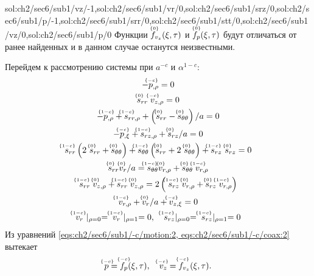 \expandafter\gdef\csname sol:ch2/sec6/sub1/main/int\endcsname{sol:ch2/sec6/sub1/vz/-1,sol:ch2/sec6/sub1/vr/0,sol:ch2/sec6/sub1/srz/0,sol:ch2/sec6/sub1/p/-1,sol:ch2/sec6/sub1/srr/0,sol:ch2/sec6/sub1/stt/0,sol:ch2/sec6/sub1/vz/0,sol:ch2/sec6/sub1/p/0}
Функции $\uindex{f}{0}_{v_{z}}(\xi,\tau)$ и $\uindex{f}{0}_{p}(\xi,\tau)$ будут отличаться от ранее найденных и в данном случае останутся неизвестными.

Перейдем к рассмотрению системы при $a^{-c}$ и $\alpha^{1-c}$:
\begin{gather}
  \label{eqs:ch2/sec6/sub1/-c/motion:2}
  -\uindex{p}{-c}_{,\rho} = 0
  \\
  \label{eqs:ch2/sec6/sub1/-c/coax:2}
  \uindex{s}{0}_{rr} \; \uindex{v}{-c}_{z,\rho} = 0
  \\
  \label{eqs:ch2/sec6/sub1/1-c/motion:1}
  -\uindex{p}{1-c}_{,\rho}+\uindex{s}{1-c}_{rr,\rho} +\left(\uindex{s}{0}_{rr}-\uindex{s}{0}_{\theta\theta}\right) / a = 0
  \\
  \label{eqs:ch2/sec6/sub1/1-c/motion:2}
  -\uindex{p}{-c}_{,\xi} + \uindex{s}{1-c}_{rz,\rho} + \uindex{s}{0}_{rz} / a = 0
  \\
  \label{eqs:ch2/sec6/sub1/1-c/plasticity}
  \uindex{s}{1-c}_{rr} \left(2 \ \uindex{s}{0}_{rr} + \uindex{s}{0}_{\theta\theta}\right) +
  \uindex{s}{1-c}_{\theta\theta} \left(\uindex{s}{0}_{rr} + 2 \ \uindex{s}{0}_{\theta\theta}\right) +
  \uindex{s}{1-c}_{rz} \ \uindex{s}{0}_{rz} = 0
  \\
  \label{eqs:ch2/sec6/sub1/1-c/coax:1}
  \uindex{s}{0}_{rr} \uindex{v}{0}_{r} / a = \uindex{s}{1-c}_{\theta\theta} \uindex{v}{0}_{r,\rho} + \uindex{s}{0}_{\theta\theta} \; \uindex{v}{1-c}_{r,\rho}
  \\
  \label{eqs:ch2/sec6/sub1/1-c/coax:2}
  \uindex{s}{1-c}_{rr} \; \uindex{v}{0}_{z,\rho} + \uindex{s}{1-c}_{rr} \; \uindex{v}{0}_{z,\rho} =
  2 \left(\; \uindex{s}{1-c}_{rz} \; \uindex{v}{0}_{r,\rho} + \uindex{s}{0}_{rz} \; \uindex{v}{1-c}_{r,\rho} \right)
  \\
  \label{eqs:ch2/sec6/sub1/1-c/uncompress}
  \uindex{v}{1-c}_{r,\rho} + \uindex{v}{0}_{r} / a + \uindex{v}{-c}_{z,\xi} = 0
  \\
  \label{eq:ch2/sec6/sub1/boundary/1-c}
  \uindex{v}{1-c}_{r} \ \lvert_{\rho=0} =\; \uindex{v}{1-c}_{r}\ \lvert_{\rho=1} = 0, \quad  \uindex{s}{1-c}_{rz}\lvert_{\rho=0} =\; \uindex{s}{1-c}_{rz}\lvert_{\rho=1} = 0
\end{gather}
Из уравнений \cref{eqs:ch2/sec6/sub1/-c/motion:2, eqs:ch2/sec6/sub1/-c/coax:2} вытекает
\begin{equation*}
  \uindex{p}{-c} = \uindex{f}{-c}_{p}(\xi, \tau), \quad \uindex{v}{-c}_{z} = \uindex{f}{-c}_{v_{z}}(\xi, \tau).
\end{equation*}
